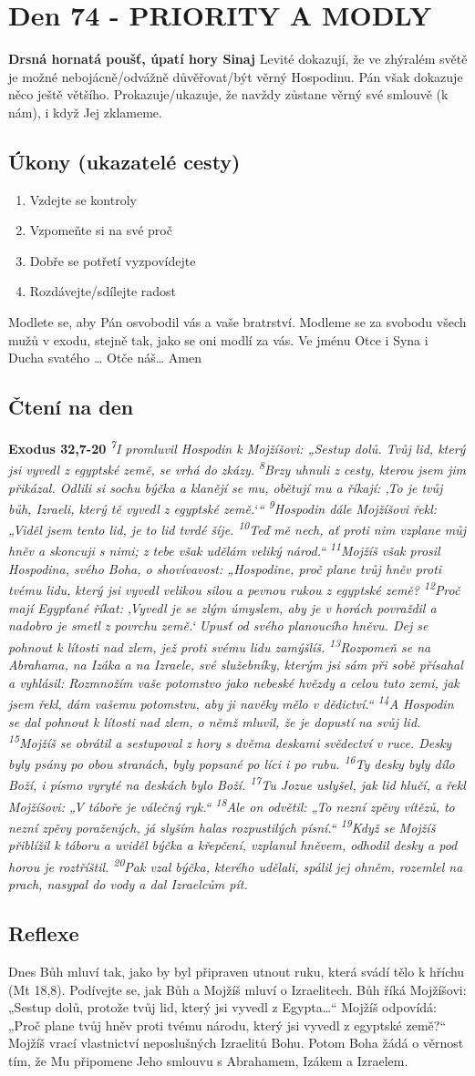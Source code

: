 \documentclass[11pt]{article}
\newcommand{\zacatekJedenactyTyden}{
\textbf{Drsná hornatá poušť, úpatí hory Sinaj} \newline 
Levité dokazují, že ve zhýralém světě je možné nebojácně/odvážně důvěřovat/být věrný Hospodinu. Pán však dokazuje něco ještě většího. Prokazuje/ukazuje, že navždy zůstane věrný své smlouvě (k nám), i když Jej zklameme.

\subsection*{Úkony (ukazatelé cesty)}
\begin{enumerate}
  \item Vzdejte se kontroly
  \item Vzpomeňte si na své proč
  \item Dobře se potřetí vyzpovídejte
  \item Rozdávejte/sdílejte radost
\end{enumerate}
Modlete se, aby Pán osvobodil vás a vaše bratrství. \newline
Modleme se za svobodu všech mužů v exodu, stejně tak, jako se oni modlí za vás.\newline
Ve jménu Otce i Syna i Ducha svatého …  Otče náš… Amen
}
\begin{document}
\newpage
\section{Den 74 - PRIORITY A MODLY}
\zacatekJedenactyTyden
\subsection*{Čtení na den}
\textbf{Exodus 32,7-20}
\newline
\textit{
\textsuperscript{7}I promluvil Hospodin k Mojžíšovi: „Sestup dolů. Tvůj lid, který jsi vyvedl z egyptské země, se vrhá do zkázy.
\textsuperscript{8}Brzy uhnuli z cesty, kterou jsem jim přikázal. Odlili si sochu býčka a klanějí se mu, obětují mu a říkají: ‚To je tvůj bůh, Izraeli, který tě vyvedl z egyptské země.‘“
\textsuperscript{9}Hospodin dále Mojžíšovi řekl: „Viděl jsem tento lid, je to lid tvrdé šíje.
\textsuperscript{10}Teď mě nech, ať proti nim vzplane můj hněv a skoncuji s nimi; z tebe však udělám veliký národ.“
\textsuperscript{11}Mojžíš však prosil Hospodina, svého Boha, o shovívavost: „Hospodine, proč plane tvůj hněv proti tvému lidu, který jsi vyvedl velikou silou a pevnou rukou z egyptské země?
\textsuperscript{12}Proč mají Egypťané říkat: ‚Vyvedl je se zlým úmyslem, aby je v horách povraždil a nadobro je smetl z povrchu země.‘ Upusť od svého planoucího hněvu. Dej se pohnout k lítosti nad zlem, jež proti svému lidu zamýšlíš.
\textsuperscript{13}Rozpomeň se na Abrahama, na Izáka a na Izraele, své služebníky, kterým jsi sám při sobě přísahal a vyhlásil: Rozmnožím vaše potomstvo jako nebeské hvězdy a celou tuto zemi, jak jsem řekl, dám vašemu potomstvu, aby ji navěky mělo v dědictví.“
\textsuperscript{14}A Hospodin se dal pohnout k lítosti nad zlem, o němž mluvil, že je dopustí na svůj lid.
\textsuperscript{15}Mojžíš se obrátil a sestupoval z hory s dvěma deskami svědectví v ruce. Desky byly psány po obou stranách, byly popsané po líci i po rubu.
\textsuperscript{16}Ty desky byly dílo Boží, i písmo vyryté na deskách bylo Boží.
\textsuperscript{17}Tu Jozue uslyšel, jak lid hlučí, a řekl Mojžíšovi: „V táboře je válečný ryk.“
\textsuperscript{18}Ale on odvětil: „To nezní zpěvy vítězů, to nezní zpěvy poražených, já slyším halas rozpustilých písní.“
\textsuperscript{19}Když se Mojžíš přiblížil k táboru a uviděl býčka a křepčení, vzplanul hněvem, odhodil desky a pod horou je roztříštil.
\textsuperscript{20}Pak vzal býčka, kterého udělali, spálil jej ohněm, rozemlel na prach, nasypal do vody a dal Izraelcům pít.
}

\subsection*{Reflexe}
Dnes Bůh mluví tak, jako by byl připraven utnout ruku, která svádí tělo k hříchu (Mt 18,8). Podívejte se, jak Bůh a Mojžíš mluví o
Izraelitech. Bůh říká Mojžíšovi: „Sestup dolů, protože tvůj lid, který jsi vyvedl z Egypta…“ Mojžíš odpovídá: „Proč plane tvůj
hněv proti tvému národu, který jsi vyvedl z egyptské země?“ Mojžíš vrací vlastnictví neposlušných Izraelitů Bohu. Potom Boha
žádá o věrnost tím, že Mu připomene Jeho smlouvu s Abrahamem, Izákem a Izraelem.
\end{document}
